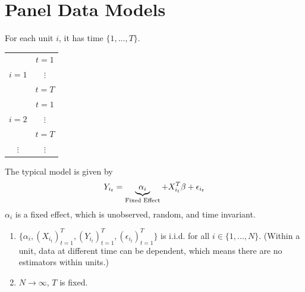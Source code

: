 \documentclass[11pt]{elegantbook}
\begin{document}
\section{Panel Data Models}
\begin{definition}
    \normalfont
    For each unit $i$, it has time $\{1,...,T\}$.
    \begin{center}
        \begin{tabular}{cc}
            \hline
                & $t=1$\\
                $i=1$& $\vdots$\\
                & $t=T$\\
            \hline
                & $t=1$\\
                $i=2$& $\vdots$\\
                & $t=T$\\
            \hline
            $\vdots$&$\vdots$
        \end{tabular}
    \end{center}
\end{definition}
The typical model is given by
\begin{equation}
    \begin{aligned}
        Y_{i_t}=\underbrace{\alpha_i}_\textnormal{Fixed Effect}+X_{i_t}^T\beta+\epsilon_{i_t}
    \end{aligned}
    \nonumber
\end{equation}
$\alpha_i$ is a fixed effect, which is unobserved, random, and time invariant.
\begin{assumption}
    \begin{enumerate}
        \item $\{\alpha_i,\left(X_{i_t}\right)_{t=1}^T,\left(Y_{i_t}\right)_{t=1}^T,\left(\epsilon_{i_t}\right)_{t=1}^T\}$ is i.i.d. for all $i\in\{1,...,N\}$. (Within a unit, data at different time can be dependent, which means there are no estimators within units.)
        \item $N \rightarrow \infty$, $T$ is fixed.
    \end{enumerate}
\end{assumption}
\end{document}
